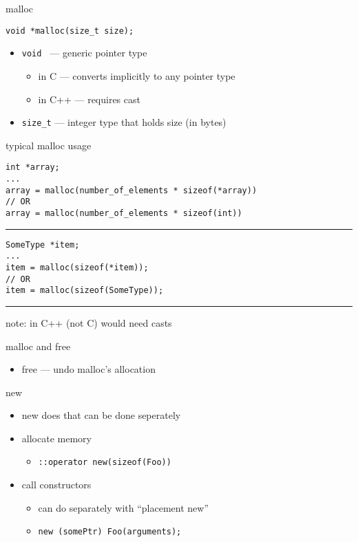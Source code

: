 \begin{frame}[fragile,label=mallocPrototype]{malloc}
\lstset{language=C++,style=small}
\begin{lstlisting}
void *malloc(size_t size);
\end{lstlisting}
\begin{itemize}
\item \texttt{void \*} --- generic pointer type
    \begin{itemize}
    \item in C --- converts implicitly to any pointer type
    \item in C++ --- requires cast
    \end{itemize}
\item \texttt{size\_t} --- integer type that holds size (in bytes)
\end{itemize}
\end{frame}

\begin{frame}[fragile,label=mallocUsage1]{typical malloc usage}
\lstset{language=C++,style=smaller}
\begin{lstlisting}
int *array;
...
array = malloc(number_of_elements * sizeof(*array))
// OR
array = malloc(number_of_elements * sizeof(int))
\end{lstlisting}
\hrule
\begin{lstlisting}
SomeType *item;
...
item = malloc(sizeof(*item));
// OR
item = malloc(sizeof(SomeType));
\end{lstlisting}
\hrule
note: in C++ (not C) would need casts
\end{frame}

\begin{frame}{malloc and free}
\begin{itemize}
\item free --- undo malloc's allocation
\end{itemize}
\end{frame}

\begin{frame}[fragile,label=newParts]{new}
\lstset{language=C++}
\begin{itemize}
    \item new does  that can be done seperately
    \vspace{.5cm}
    \item allocate memory
        \begin{itemize}
        \item \texttt{::operator new(sizeof(Foo))}
        \end{itemize}
    \item call constructors
        \begin{itemize}
        \item can do separately with ``placement new''
        \item \lstinline|new (somePtr) Foo(arguments);|
        \end{itemize}
    \end{itemize}
\end{frame}

